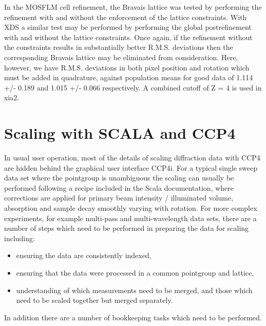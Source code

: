 \documentclass[a4paper, 11pt]{article}
\begin{document}
In the MOSFLM cell refinement, the Bravais lattice was tested by performing the refinement with and without the enforcement of the lattice constraints. With XDS a similar test may be performed by performing the global postrefinement with and without the lattice constraints. Once again, if the refinement without the constraints results in substantially better R.M.S. deviations then the corresponding Bravais lattice may be eliminated from consideration. Here, however, we have R.M.S. deviations in both pixel position and rotation which must be added in quadrature, against population means for good data of 1.114 +/- 0.189 and 1.015 +/- 0.066 respectively. A combined cutoff of Z = 4 is used in xia2.

\section{Scaling with SCALA and CCP4}

In usual user operation, most of the details of scaling diffraction data with CCP4 are hidden behind the graphical user interface CCP4i. For a typical single sweep data set where the pointgroup is unambiguous the scaling can usually be performed following a recipe included in the Scala documentation, where corrections are applied for primary beam intensity / illuminated volume, absorption and sample decay smoothly varying with rotation. For more complex experiments, for example multi-pass and multi-wavelength data sets, there are a number of steps which need to be performed in preparing the data for scaling including:

\begin{itemize}
\item{ensuring the data are consistently indexed,}
\item{ensuring that the data were processed in a common pointgroup and lattice,}
\item{understanding of which measurements need to be merged, and those which need to be scaled together but merged separately.}
\end{itemize}

\noindent
In addition there are a number of bookkeeping tasks which need to be performed. 
\end{document}

